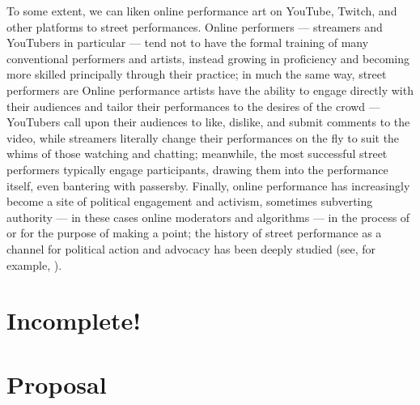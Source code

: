 \documentclass[10pt]{article}
\begin{document}
To some extent, we can liken online performance art on YouTube, Twitch, and other platforms to street performances.
Online performers
--- streamers and YouTubers in particular ---
tend not to have the formal training of many conventional performers and artists,
instead growing in proficiency and becoming more skilled principally through their practice;
in much the same way,
street performers are 
%
Online performance artists have the ability
to engage directly with their audiences and tailor their performances to the desires of the crowd
--- YouTubers call upon their audiences to like, dislike, and submit comments to the video, while
    streamers literally change their performances on the fly to suit the whims of those watching and chatting;
meanwhile, the most successful street performers typically engage participants,
drawing them into the performance itself, even bantering with passersby.
%
Finally, online performance has increasingly become a site of political engagement and activism,
sometimes subverting authority
--- in these cases online moderators and algorithms ---
in the process of or for the purpose of making a point;
the history of street performance as a channel for political action and advocacy has been deeply studied
(see, for example, \cite{harrison1990drawing,cohen1998radical}).
\section*{Incomplete!}
\section*{Proposal}





\end{document}
